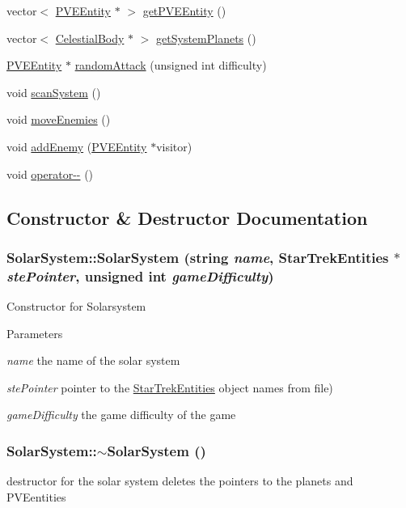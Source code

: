 \begin{DoxyCompactItemize}
\item 
vector$<$ \hyperlink{classPVEEntity}{PVEEntity} $\ast$ $>$ \hyperlink{classSolarSystem_a4743c88ee83ef7ae0ed3a308004179bb}{getPVEEntity} ()
\item 
vector$<$ \hyperlink{classCelestialBody}{CelestialBody} $\ast$ $>$ \hyperlink{classSolarSystem_a334394234a898ccb7b35ee0f2ab8e648}{getSystemPlanets} ()
\item 
\hyperlink{classPVEEntity}{PVEEntity} $\ast$ \hyperlink{classSolarSystem_a6f30ebe96f6ef56d967f3e6c368057d2}{randomAttack} (unsigned int difficulty)
\item 
void \hyperlink{classSolarSystem_a891417265b57aa785bd808fc7a2485c4}{scanSystem} ()
\item 
void \hyperlink{classSolarSystem_a1efb6ebd3741f3fce2f5cb7d1eeffc19}{moveEnemies} ()
\item 
void \hyperlink{classSolarSystem_a95839db98d8dbf297536fba1aae7f2a6}{addEnemy} (\hyperlink{classPVEEntity}{PVEEntity} $\ast$visitor)
\item 
void \hyperlink{classSolarSystem_a41f1cdf83a580bd2258d9233ef0cdb4f}{operator-\/-\/} ()
\end{DoxyCompactItemize}


\subsection{Constructor \& Destructor Documentation}
\hypertarget{classSolarSystem_a459f5b68b920b9816788e76b6a821488}{
\subsubsection[{SolarSystem}]{\setlength{\rightskip}{0pt plus 5cm}SolarSystem::SolarSystem (string {\em name}, \/  {\bf StarTrekEntities} $\ast$ {\em stePointer}, \/  unsigned int {\em gameDifficulty})}}
\label{df/d5e/classSolarSystem_a459f5b68b920b9816788e76b6a821488}
Constructor for Solarsystem


\begin{DoxyParams}{Parameters}
\item[{\em name}]the name of the solar system \item[{\em stePointer}]pointer to the \hyperlink{classStarTrekEntities}{StarTrekEntities} object names from file) \item[{\em gameDifficulty}]the game difficulty of the game \end{DoxyParams}
\hypertarget{classSolarSystem_ac520dce0faa7df3755326fb2b6f7b51a}{
\subsubsection[{$\sim$SolarSystem}]{\setlength{\rightskip}{0pt plus 5cm}SolarSystem::$\sim$SolarSystem ()}}
\label{df/d5e/classSolarSystem_ac520dce0faa7df3755326fb2b6f7b51a}
destructor for the solar system deletes the pointers to the planets and PVEentities 

